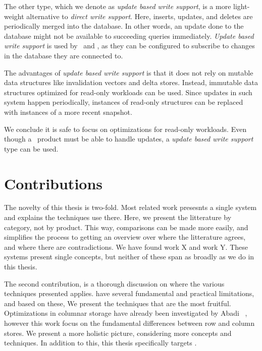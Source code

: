 The other type, which we denote as \textit{update based write support}, is a more light-weight alternative to \textit{direct write support}. Here, inserts, updates, and deletes are periodically merged into the database. In other words, an update done to the database might not be available to succeeding queries immediately. \textit{Update based write support} is used by \qlikview~and \tableau, as they can be configured to subscribe to changes in the database they are connected to.

The advantages of \textit{update based write support} is that it does not rely on mutable data structures like invalidation vectors and delta stores. Instead, immutable data structures optimized for read-only workloads can be used. Since updates in such system happen periodically, instances of read-only structures can be replaced with instances of a more recent snapshot.

We conclude it is safe to focus on optimizations for read-only workloads. Even though a \bd~product must be able to handle updates, a \textit{update based write support} type can be used.



\section{Contributions}
\label{sec:Contributions}
The novelty of this thesis is two-fold. Most related work presesnts a single system and explains the techniques use there. Here, we present the litterature by category, not by product. This way, comparisons can be made more easily, and simplifies the process to getting an overview over where the litterature agrees, and where there are contradictions. We have found work X and work Y. These systems present single concepts, but neither of these span as broadly as we do in this thesis.

The second contribution, is a thorough discussion on where the various techniques presented applies. \genusSoftware have several fundamental and practical limitations, and based on these, We present the techniques that are the most fruitful. Optimizations in columnar storage have already been investigated by Abadi \ea~\cite{Abadi2008-dd}, however this work focus on the fundamental differences between row and column stores. We present a more holistic picture, considering more concepts and techniques. In addition to this, this thesis specifically targets \genusSoftware.


